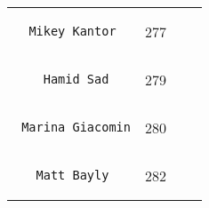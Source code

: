 \documentclass[]{article}
\begin{document}
\begin{longtable}[c]{@{}llll@{}}
\begin{minipage}[t]{0.39\columnwidth}
\begin{verbatim}
  Mikey Kantor
\end{verbatim}
\end{minipage} & \begin{minipage}[t]{0.10\columnwidth}\raggedright
277
\end{minipage} & \begin{minipage}[t]{0.13\columnwidth}\raggedright
\end{minipage} & \begin{minipage}[t]{0.15\columnwidth}\raggedright
\end{minipage}
\\\noalign{\medskip}
\begin{minipage}[t]{0.39\columnwidth}\raggedright
\begin{verbatim}
    Hamid Sad
\end{verbatim}
\end{minipage} & \begin{minipage}[t]{0.10\columnwidth}\raggedright
279
\end{minipage} & \begin{minipage}[t]{0.13\columnwidth}\raggedright
\end{minipage} & \begin{minipage}[t]{0.15\columnwidth}\raggedright
\end{minipage}
\\\noalign{\medskip}
\begin{minipage}[t]{0.39\columnwidth}\raggedright
\begin{verbatim}
 Marina Giacomin
\end{verbatim}
\end{minipage} & \begin{minipage}[t]{0.10\columnwidth}\raggedright
280
\end{minipage} & \begin{minipage}[t]{0.13\columnwidth}\raggedright
\end{minipage} & \begin{minipage}[t]{0.15\columnwidth}\raggedright
\end{minipage}
\\\noalign{\medskip}
\begin{minipage}[t]{0.39\columnwidth}\raggedright
\begin{verbatim}
   Matt Bayly
\end{verbatim}
\end{minipage} & \begin{minipage}[t]{0.10\columnwidth}\raggedright
282
\end{minipage} & \begin{minipage}[t]{0.13\columnwidth}\raggedright

\end{minipage}
\end{longtable}
\end{document}
